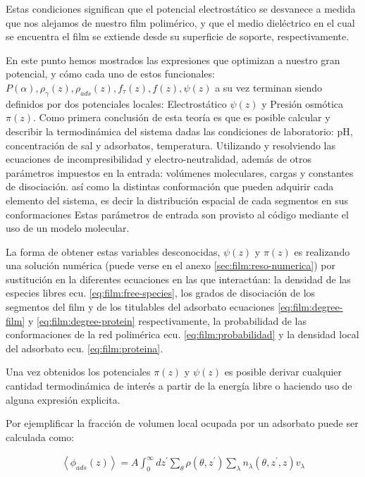 Estas condiciones significan que el potencial electrost\'atico se desvanece a medida que nos alejamos de nuestro film polim\'erico,  y que el medio diel\'ectrico en el cual se encuentra el film  se extiende desde su superficie de soporte, respectivamente. 

En este punto hemos mostrados las expresiones que optimizan a nuestro gran potencial, y c\'omo cada uno de estos funcionales: $P(\alpha), \rho_\gamma(z),\rho_{ads}(z), f_\tau(z), f(z), \psi(z) $ a su vez  terminan siendo definidos por dos potenciales locales: Electrost\'atico $\psi(z)$ y Presi\'on osm\'otica $\pi(z)$. 
Como primera conclusi\'on de esta teor\'ia es que es posible calcular y describir la termodin\'amica del sistema dadas las condiciones de laboratorio: pH, concentraci\'on de sal y adsorbatos, temperatura. Utilizando y resolviendo las ecuaciones de incompresibilidad y  electro-neutralidad, adem\'as de otros par\'ametros impuestos en la entrada: vol\'umenes moleculares, cargas y constantes de disociaci\'on. as\'i como la distintas conformaci\'on que pueden adquirir cada elemento del sistema, es decir la distribuci\'on espacial de cada segmentos en sus conformaciones
Estas par\'ametros de entrada son provisto al c\'odigo mediante el uso de un modelo molecular. 

La forma de obtener estas variables desconocidas, $\psi(z)$ y $\pi(z)$  es realizando una soluci\'on num\'erica (puede verse en el anexo \ref{sec:film:reso-numerica}) por sustituci\'on en la diferentes ecuaciones en las que interact\'uan: la densidad de las especies libres ecu. \ref{eq:film:free-species}, los grados de disociaci\'on de los segmentos del film y de los  titulables del adsorbato ecuaciones \ref{eq:film:degree-film} y \ref{eq:film:degree-protein} respectivamente, la probabilidad de las conformaciones de la red polim\'erica ecu. \ref{eq:film:probabilidad} y la densidad local del adsorbato  ecu. \ref{eq:film:proteina}.

Una vez obtenidos los potenciales $\pi(z)$ y $\psi(z)$ es posible derivar  cualquier cantidad termodin\'amica de inter\'es  a partir de la energ\'ia libre o haciendo uso de alguna expresi\'on explicita. 

Por ejemplificar la fracci\'on de volumen local ocupada por un adsorbato puede ser calculada como:

\begin{align}
	\left< \phi_{ads}(z) \right> = A\int_0^\infty dz^\prime \sum_\theta \rho(\theta, z^\prime)\sum_\lambda n_\lambda(\theta, z^\prime, z)v_\lambda
\end{align}

